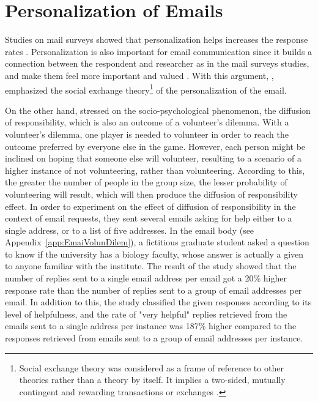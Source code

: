 \section{Personalization of Emails}
\label{sec:2.3:PersEmai}
Studies on mail surveys showed that personalization helps increases the response rates \citep{Dillman1991,Schaefer1998}. Personalization is also important for email communication since it builds a connection between the respondent and researcher as in the mail surveys studies, and make them feel more important and valued \citep[page 272]{DillmanDonA.SmythJoleneD.Christian2009}. With this argument, \cite{DillmanDonA.SmythJoleneD.Christian2009}, emphasized the social exchange theory\footnote{Social exchange theory was considered as a frame of reference to other theories rather than a theory by itself. It implies a two-sided, mutually contingent and rewarding transactions or exchanges \citep{Emerson1976}.} of the personalization of the email.
\vspace{1cm}

On the other hand, \cite{Barron2002} stressed on the socio-psychological phenomenon, the diffusion of responsibility, which is also an outcome of a volunteer's dilemma. With a volunteer's dilemma, one player is needed to volunteer in order to reach the outcome preferred by everyone else in the game. However, each person might be inclined on hoping that someone else will volunteer, resulting to a scenario of a higher instance of not volunteering, rather than volunteering. According to this, the greater the number of people in the group size, the lesser probability of volunteering will result, which will then produce the diffusion of responsibility effect. In order to experiment on the effect of diffusion of responsibility in the context of email requests, they sent several emails asking for help either to a single address, or to a list of five addresses. In the email body (see Appendix~\ref{app:EmaiVolunDilem}), a fictitious graduate student asked a question to know if the university has a biology faculty, whose answer is actually a given to anyone familiar with the institute. The result of the study showed that the number of replies sent to a single email address per email got a 20\% higher response rate than the number of replies sent to a group of email addresses per email. In addition to this, the study classified the given responses according to its level of helpfulness, and the rate of "very helpful" replies retrieved from the emails sent to a single address per instance was 187\% higher compared to the responses retrieved from emails sent to a group of email addresses per instance.
\vspace{1cm}

